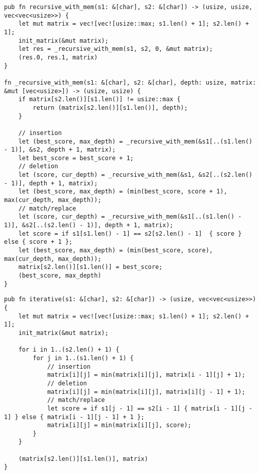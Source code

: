 \begin{lstlisting}[label=some-code,caption=Функция\, реализующая рекурсивный алгоритм с мемоизацией нахождения расстояния Левенштейна]
pub fn recursive_with_mem(s1: &[char], s2: &[char]) -> (usize, usize, vec<vec<usize>>) {
    let mut matrix = vec![vec![usize::max; s1.len() + 1]; s2.len() + 1];
    init_matrix(&mut matrix);
    let res = _recursive_with_mem(s1, s2, 0, &mut matrix);
    (res.0, res.1, matrix)
}

fn _recursive_with_mem(s1: &[char], s2: &[char], depth: usize, matrix: &mut [vec<usize>]) -> (usize, usize) {
    if matrix[s2.len()][s1.len()] != usize::max {
        return (matrix[s2.len()][s1.len()], depth);
    }

    // insertion
    let (best_score, max_depth) = _recursive_with_mem(&s1[..(s1.len() - 1)], &s2, depth + 1, matrix);
    let best_score = best_score + 1;
    // deletion
    let (score, cur_depth) = _recursive_with_mem(&s1, &s2[..(s2.len() - 1)], depth + 1, matrix);
    let (best_score, max_depth) = (min(best_score, score + 1), max(cur_depth, max_depth));
    // match/replace
    let (score, cur_depth) = _recursive_with_mem(&s1[..(s1.len() - 1)], &s2[..(s2.len() - 1)], depth + 1, matrix);
    let score = if s1[s1.len() - 1] == s2[s2.len() - 1]  { score } else { score + 1 };
    let (best_score, max_depth) = (min(best_score, score), max(cur_depth, max_depth));
    matrix[s2.len()][s1.len()] = best_score;
    (best_score, max_depth)
}
\end{lstlisting}

\begin{lstlisting}[label=some-code,caption=Функция\, реализующая итеративный алгоритм нахождения расстояния левенштейна]
pub fn iterative(s1: &[char], s2: &[char]) -> (usize, vec<vec<usize>>) {
    let mut matrix = vec![vec![usize::max; s1.len() + 1]; s2.len() + 1];
    init_matrix(&mut matrix);

    for i in 1..(s2.len() + 1) {
        for j in 1..(s1.len() + 1) {
            // insertion
            matrix[i][j] = min(matrix[i][j], matrix[i - 1][j] + 1);
            // deletion
            matrix[i][j] = min(matrix[i][j], matrix[i][j - 1] + 1);
            // match/replace
            let score = if s1[j - 1] == s2[i - 1] { matrix[i - 1][j - 1] } else { matrix[i - 1][j - 1] + 1 };
            matrix[i][j] = min(matrix[i][j], score);
        }
    }

    (matrix[s2.len()][s1.len()], matrix)
}
\end{lstlisting}


